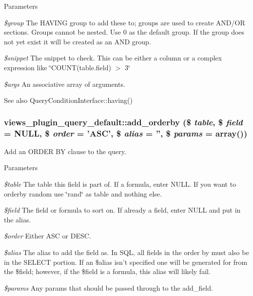 \begin{DoxyParams}{Parameters}
\item[{\em \$group}]The HAVING group to add these to; groups are used to create AND/OR sections. Groups cannot be nested. Use 0 as the default group. If the group does not yet exist it will be created as an AND group. \item[{\em \$snippet}]The snippet to check. This can be either a column or a complex expression like \char`\"{}COUNT(table.field) $>$ 3\char`\"{} \item[{\em \$args}]An associative array of arguments.\end{DoxyParams}
\begin{DoxySeeAlso}{See also}
QueryConditionInterface::having() 
\end{DoxySeeAlso}
\hypertarget{classviews__plugin__query__default_a7741425c0113d4bffb0e27266346a4d6}{
\subsubsection[{add\_\-orderby}]{\setlength{\rightskip}{0pt plus 5cm}views\_\-plugin\_\-query\_\-default::add\_\-orderby (\$ {\em table}, \/  \$ {\em field} = {\ttfamily NULL}, \/  \$ {\em order} = {\ttfamily 'ASC'}, \/  \$ {\em alias} = {\ttfamily ''}, \/  \$ {\em params} = {\ttfamily array()})}}
\label{classviews__plugin__query__default_a7741425c0113d4bffb0e27266346a4d6}
Add an ORDER BY clause to the query.


\begin{DoxyParams}{Parameters}
\item[{\em \$table}]The table this field is part of. If a formula, enter NULL. If you want to orderby random use \char`\"{}rand\char`\"{} as table and nothing else. \item[{\em \$field}]The field or formula to sort on. If already a field, enter NULL and put in the alias. \item[{\em \$order}]Either ASC or DESC. \item[{\em \$alias}]The alias to add the field as. In SQL, all fields in the order by must also be in the SELECT portion. If an \$alias isn't specified one will be generated for from the \$field; however, if the \$field is a formula, this alias will likely fail. \item[{\em \$params}]Any params that should be passed through to the add\_\-field. \end{DoxyParams}


